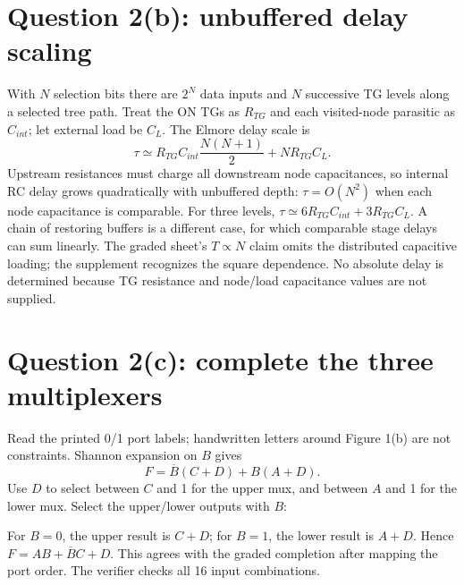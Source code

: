 \documentclass[10pt]{article}
\begin{document}
\newpage\section*{Question 2(b): unbuffered delay scaling}
With $N$ selection bits there are $2^N$ data inputs and $N$ successive TG levels along a selected tree path. Treat the ON TGs as $R_{TG}$ and each visited-node parasitic as $C_{int}$; let external load be $C_L$. The Elmore delay scale is
\[\tau\simeq R_{TG}C_{int}\frac{N(N+1)}2+N R_{TG}C_L.\]
Upstream resistances must charge all downstream node capacitances, so internal RC delay grows quadratically with unbuffered depth: $\tau=O(N^2)$ when each node capacitance is comparable. For three levels, $\tau\simeq6R_{TG}C_{int}+3R_{TG}C_L$. A chain of restoring buffers is a different case, for which comparable stage delays can sum linearly. The graded sheet's $T\propto N$ claim omits the distributed capacitive loading; the supplement recognizes the square dependence. No absolute delay is determined because TG resistance and node/load capacitance values are not supplied.

\section*{Question 2(c): complete the three multiplexers}
Read the printed 0/1 port labels; handwritten letters around Figure 1(b) are not constraints. Shannon expansion on $B$ gives
\[F=\overline B(C+D)+B(A+D).\]
Use $D$ to select between $C$ and 1 for the upper mux, and between $A$ and 1 for the lower mux. Select the upper/lower outputs with $B$:
\begin{center}\end{center}
For $B=0$, the upper result is $C+D$; for $B=1$, the lower result is $A+D$. Hence $F=AB+\overline{B}C+D$. This agrees with the graded completion after mapping the port order. The verifier checks all 16 input combinations.
\end{document}
